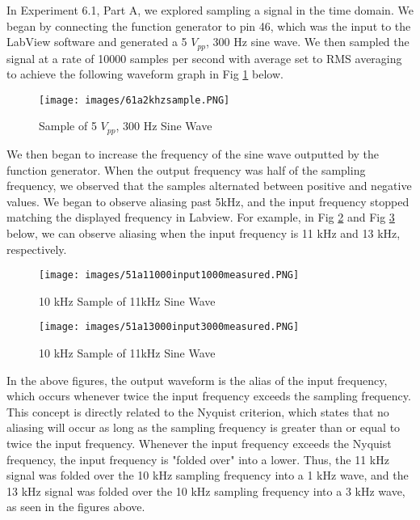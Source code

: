 \documentclass[10pt]{article}
\begin{document}
In Experiment 6.1, Part A, we explored sampling a signal in the time domain. We began by connecting the function generator to pin 46, which was the input to the LabView software and generated a 5 $V_{pp}$, 300 Hz sine wave. We then sampled the signal at a rate of 10000 samples per second with average set to RMS averaging to achieve the following waveform graph in Fig \ref{fig:firstsample} below. 

\begin{centering}
	\begin{figure} [H]
		\centering
		\texttt{[image: images/61a2khzsample.PNG]}
		\caption{Sample of 5 $V_{pp}$, 300 Hz Sine Wave}
		\label{fig:firstsample}
	\end{figure}
\end{centering}

We then began to increase the frequency of the sine wave outputted by the function generator. When the output frequency was half of the sampling frequency, we observed that the samples alternated between positive and negative values. We began to observe aliasing past 5kHz, and the input frequency stopped matching the displayed frequency in Labview. For example, in Fig \ref{fig:11khz} and Fig \ref{fig:13khz} below, we can observe aliasing when the input frequency is 11 kHz and 13 kHz, respectively. 

\begin{centering}
	\begin{figure} [H]
		\centering
		\texttt{[image: images/51a11000input1000measured.PNG]}
		\caption{10 kHz Sample of 11kHz Sine Wave}
		\label{fig:11khz}
	\end{figure}
\end{centering}

\begin{centering}
	\begin{figure} [H]
		\centering
		\texttt{[image: images/51a13000input3000measured.PNG]}
		\caption{10 kHz Sample of 11kHz Sine Wave}
		\label{fig:13khz}
	\end{figure}
\end{centering}

In the above figures, the output waveform is the alias of the input frequency, which occurs whenever twice the input frequency exceeds the sampling frequency. This concept is directly related to the Nyquist criterion, which states that no aliasing will occur as long as the sampling frequency is greater than or equal to twice the input frequency. Whenever the input frequency exceeds the Nyquist frequency, the input frequency is "folded over" into a lower. Thus, the 11 kHz signal was folded over the 10 kHz sampling frequency into a 1 kHz wave, and the 13 kHz signal was folded over the 10 kHz sampling frequency into a 3 kHz wave, as seen in the figures above. 
\end{document}
